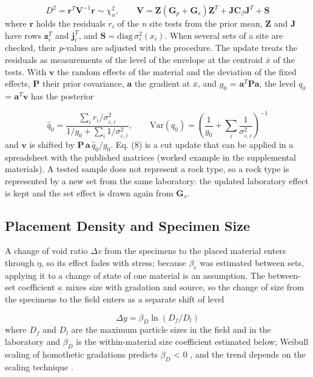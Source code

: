 \documentclass[Journal,letterpaper]{ascelike-new}
\begin{document}
\begin{equation}
D^2=\mathbf{r}^T\mathbf{V}^{-1}\mathbf{r}\sim\chi^2_n,\qquad \mathbf{V}=\mathbf{Z}(\mathbf{G}_p+\mathbf{G}_s)\mathbf{Z}^T+\mathbf{J}\mathbf{C}_\beta\mathbf{J}^T+\mathbf{S}
\end{equation}
\noindent where $\mathbf{r}$ holds the residuals $r_i$ of the \textit{n} site tests from the prior mean, $\mathbf{Z}$ and $\mathbf{J}$ have rows $\mathbf{z}_i^T$ and $\mathbf{j}_i^T$, and $\mathbf{S}=\mathrm{diag}\,\sigma_\varepsilon^2(x_i)$. When several sets of a site are checked, their \textit{p}-values are adjusted with the  procedure. The update treats the residuals as measurements of the level of the envelope at the centroid $\bar{x}$ of the tests. With $\mathbf{v}$ the random effects of the material and the deviation of the fixed effects, $\mathbf{P}$ their prior covariance, $\mathbf{a}$ the gradient at $\bar{x}$, and $g_0$ = $\mathbf{a}^T\mathbf{P}\mathbf{a}$, the level $q_0$ = $\mathbf{a}^T\mathbf{v}$ has the posterior

\begin{equation}
\hat q_0=\frac{\sum_i r_i/\sigma_{\varepsilon,i}^2}{1/g_0+\sum_i 1/\sigma_{\varepsilon,i}^2},\qquad \mathrm{Var}(q_0)=\left(\frac{1}{g_0}+\sum_i\frac{1}{\sigma_{\varepsilon,i}^2}\right)^{-1}
\end{equation}
\noindent and $\mathbf{v}$ is shifted by $\mathbf{P}\,\mathbf{a}\,\hat q_0/g_0$. Eq. (8) is a cut update that can be applied in a spreadsheet with the published matrices (worked example in the supplemental materials). A tested sample does not represent a rock type, so a rock type is represented by a new set from the same laboratory: the updated laboratory effect is kept and the set effect is drawn again from $\mathbf{G}_s$.

\subsection{Placement Density and Specimen Size}
A change of void ratio $\Delta$\textit{e} from the specimens to the placed material enters through $\eta$, so its effect fades with stress; because $\beta_e$ was estimated between sets, applying it to a change of state of one material is an assumption. The between-set coefficient $\kappa$ mixes size with gradation and source, so the change of size from the specimens to the field enters as a separate shift of level

\begin{equation}
\Delta y=\beta_D\ln\left(D_f/D_l\right)
\end{equation}
\noindent where $D_f$ and $D_l$ are the maximum particle sizes in the field and in the laboratory and $\beta_D$ is the within-material size coefficient estimated below; Weibull scaling of homothetic gradations predicts $\beta_D$ < 0 \cite{frossard2012,ovalle2014,alonso2012}, and the trend depends on the scaling technique \cite{ovalle2020b,girumugisha2026}.
\end{document}
